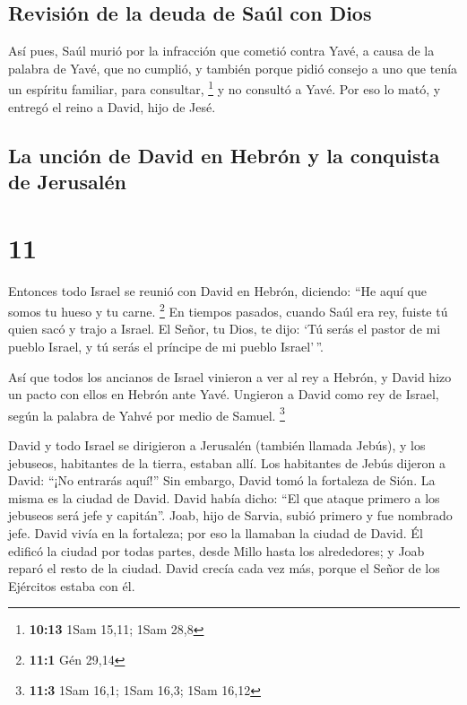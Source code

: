 \hypertarget{revisiuxf3n-de-la-deuda-de-sauxfal-con-dios}{%
\subsection{Revisión de la deuda de Saúl con
Dios}\label{revisiuxf3n-de-la-deuda-de-sauxfal-con-dios}}

 Así pues, Saúl murió por la infracción que cometió
contra Yavé, a causa de la palabra de Yavé, que no cumplió, y también
porque pidió consejo a uno que tenía un espíritu familiar, para
consultar, \footnote{\textbf{10:13} 1Sam 15,11; 1Sam 28,8}
 y no consultó a Yavé. Por eso lo mató, y entregó el
reino a David, hijo de Jesé.

\hypertarget{la-unciuxf3n-de-david-en-hebruxf3n-y-la-conquista-de-jerusaluxe9n}{%
\subsection{La unción de David en Hebrón y la conquista de
Jerusalén}\label{la-unciuxf3n-de-david-en-hebruxf3n-y-la-conquista-de-jerusaluxe9n}}

\hypertarget{section-10}{%
\section{11}\label{section-10}}

 Entonces todo Israel se reunió con David en Hebrón,
diciendo: ``He aquí que somos tu hueso y tu carne. \footnote{\textbf{11:1}
  Gén 29,14}  En tiempos pasados, cuando Saúl era rey,
fuiste tú quien sacó y trajo a Israel. El Señor, tu Dios, te dijo: `Tú
serás el pastor de mi pueblo Israel, y tú serás el príncipe de mi pueblo
Israel'\,''.

 Así que todos los ancianos de Israel vinieron a ver al
rey a Hebrón, y David hizo un pacto con ellos en Hebrón ante Yavé.
Ungieron a David como rey de Israel, según la palabra de Yahvé por medio
de Samuel. \footnote{\textbf{11:3} 1Sam 16,1; 1Sam 16,3; 1Sam 16,12}

 David y todo Israel se dirigieron a Jerusalén (también
llamada Jebús), y los jebuseos, habitantes de la tierra, estaban allí.
 Los habitantes de Jebús dijeron a David: ``¡No entrarás
aquí!'' Sin embargo, David tomó la fortaleza de Sión. La misma es la
ciudad de David.  David había dicho: ``El que ataque
primero a los jebuseos será jefe y capitán''. Joab, hijo de Sarvia,
subió primero y fue nombrado jefe.  David vivía en la
fortaleza; por eso la llamaban la ciudad de David.  Él
edificó la ciudad por todas partes, desde Millo hasta los alrededores; y
Joab reparó el resto de la ciudad.  David crecía cada vez
más, porque el Señor de los Ejércitos estaba con él.

